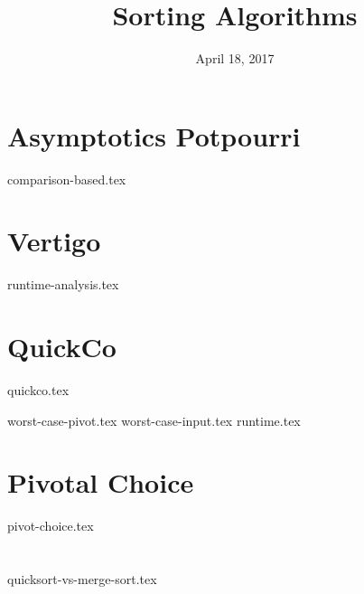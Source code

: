 \documentclass{exam}
\title{Sorting Algorithms}
\date{April 18, 2017}
\begin{document}
\maketitle

\section{Asymptotics Potpourri}
{comparison-based.tex}

\section{Vertigo}
\begin{questions}
{runtime-analysis.tex}
\end{questions}

\clearpage

\section{QuickCo}
{quickco.tex}
\begin{questions}
{worst-case-pivot.tex}
{worst-case-input.tex}
{runtime.tex}
\end{questions}

\clearpage

\section{Pivotal Choice}
\begin{questions}
{pivot-choice.tex}
\end{questions}

\clearpage

\section{}
\begin{questions}
{quicksort-vs-merge-sort.tex}
\end{questions}
\end{document}
